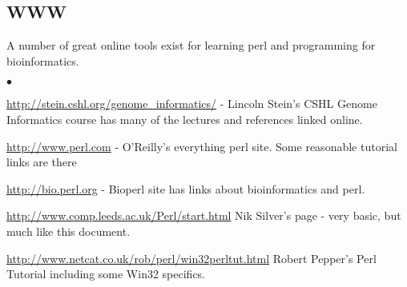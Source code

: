 \documentclass{article}
\begin{document}
\subsection{WWW}
\par

A number of great online tools exist for learning perl and programming
for bioinformatics.

\begin{list}{$ \bullet $}{}
\item \url{http://stein.cshl.org/genome_informatics/} - Lincoln Stein's CSHL Genome Informatics course has many of the lectures and references
linked online.

\item \url{http://www.perl.com} - O'Reilly's everything perl site.
Some reasonable tutorial links are there

\item \url{http://bio.perl.org} - Bioperl site has links about
bioinformatics and perl.

\item \url{http://www.comp.leeds.ac.uk/Perl/start.html} Nik Silver's
page - very basic, but much like this document.

\item \url{http://www.netcat.co.uk/rob/perl/win32perltut.html} Robert
Pepper's Perl Tutorial including some Win32 specifics.
 
\end{list}
\end{document}
